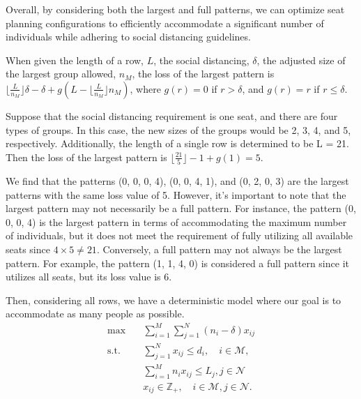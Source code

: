 Overall, by considering both the largest and full patterns, we can optimize seat planning configurations to efficiently accommodate a significant number of individuals while adhering to social distancing guidelines.

\begin{lem}\label{lem_pattern}
  When given the length of a row, $L$, the social distancing, $\delta$, the adjusted size of the largest group allowed, $n_M$, the loss of the largest pattern is $\lfloor \frac{L}{n_M} \rfloor \delta - \delta + g(L - \lfloor \frac{L}{n_M} \rfloor n_M)$, where $g(r)=0$ if $r> \delta$, and $g(r)= r$ if $r \leq \delta$.
\end{lem}

\begin{example}
  Suppose that the social distancing requirement is one seat, and there are four types of groups. In this case, the new sizes of the groups would be 2, 3, 4, and 5, respectively. Additionally, the length of a single row is determined to be L = 21. Then the loss of the largest pattern is $\lfloor \frac{21}{5} \rfloor  - 1 + g(1) = 5$.
  
  We find that the patterns (0, 0, 0, 4), (0, 0, 4, 1), and (0, 2, 0, 3) are the largest patterns with the same loss value of 5. However, it's important to note that the largest pattern may not necessarily be a full pattern. For instance, the pattern (0, 0, 0, 4) is the largest pattern in terms of accommodating the maximum number of individuals, but it does not meet the requirement of fully utilizing all available seats since $4 \times 5 \neq 21$. Conversely, a full pattern may not always be the largest pattern. For example, the pattern (1, 1, 4, 0) is considered a full pattern since it utilizes all seats, but its loss value is 6.
\end{example}

Then, considering all rows, we have a deterministic model where our goal is to accommodate as many people as possible.
\begin{equation}\label{deter_upper}
  \begin{aligned}
  \max \quad & \sum_{i=1}^{M}  \sum_{j= 1}^{N} (n_i- \delta) x_{ij} \\
  \text {s.t.} \quad & \sum_{j= 1}^{N} x_{ij} \leq d_{i}, \quad i \in \mathcal{M}, \\
  & \sum_{i=1}^{M} n_{i} x_{ij} \leq L_j, j \in \mathcal{N} \\
  & x_{ij} \in \mathbb{Z}_{+}, \quad i \in \mathcal{M}, j \in \mathcal{N}.
  \end{aligned}
\end{equation}


